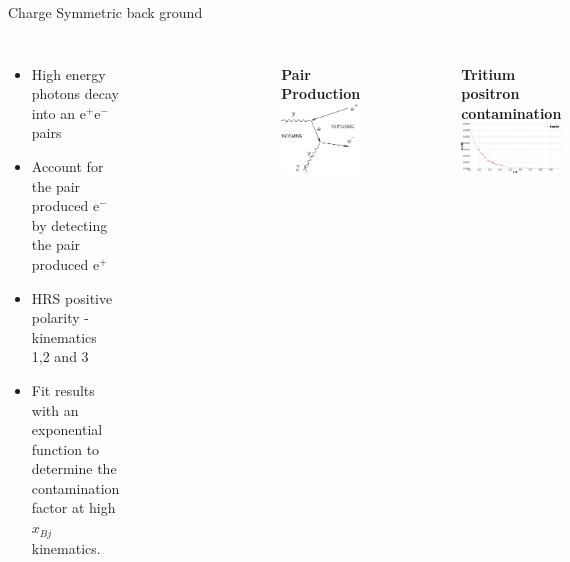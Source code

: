 \documentclass{beamer}
\begin{document}
\begin{frame}{Charge Symmetric back ground}
\vspace{-20pt}
\begin{block}{}
	\begin{columns}
		\begin{itemize}
			\item High energy photons decay into an e$^+$e$^-$ pairs
			\item Account for the pair produced e$^-$ by detecting the pair produced e$^+$
			\item HRS positive polarity - kinematics 1,2 and 3
			\item Fit results with an exponential function to determine the contamination factor at high $x_{Bj}$ kinematics.

		\end{itemize}
		\begin{figure}
			
		\end{figure}
		\vspace{-40pt}
		\begin{figure}
			\textbf{Pair Production}
			\includegraphics[width=3.0cm]{../images/pp_FD.png}
		\end{figure}
		\vspace{-20pt}
		\begin{figure}
			\textbf{Tritium positron contamination}
			\includegraphics[width=5.0cm]{../images/positron_H3_bane.pdf}
		\end{figure}
		
	\end{columns}
	
\end{block}
\end{frame}
\end{document}
